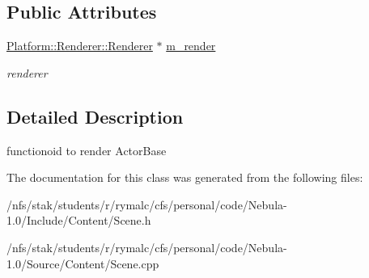 \subsection*{Public Attributes}
\begin{DoxyCompactItemize}
\item 
\hypertarget{classFunct__ActorBase__Render_a7200615bc2962ff34e82a15c71c02f9a}{
\hyperlink{classPlatform_1_1Renderer_1_1Renderer}{Platform::Renderer::Renderer} $\ast$ \hyperlink{classFunct__ActorBase__Render_a7200615bc2962ff34e82a15c71c02f9a}{m\_\-render}}
\label{classFunct__ActorBase__Render_a7200615bc2962ff34e82a15c71c02f9a}

\begin{DoxyCompactList}\small\item\em renderer \item\end{DoxyCompactList}\end{DoxyCompactItemize}


\subsection{Detailed Description}
functionoid to render ActorBase 

The documentation for this class was generated from the following files:\begin{DoxyCompactItemize}
\item 
/nfs/stak/students/r/rymalc/cfs/personal/code/Nebula-\/1.0/Include/Content/Scene.h\item 
/nfs/stak/students/r/rymalc/cfs/personal/code/Nebula-\/1.0/Source/Content/Scene.cpp\end{DoxyCompactItemize}
